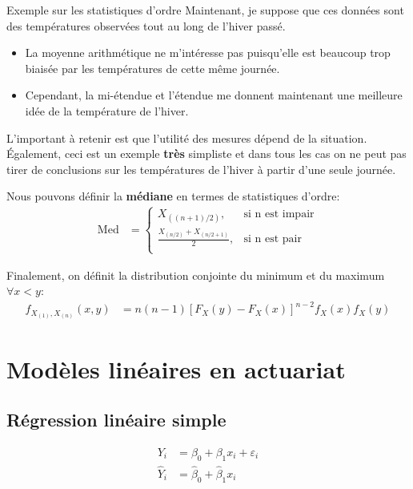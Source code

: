 \documentclass[10pt, french]{article}
\begin{document}
\begin{multicols*}{2}
\begin{conceptgen}{Exemple sur les statistiques d'ordre}
Maintenant, je suppose que ces données sont des températures observées tout au long de l'hiver passé.
\begin{itemize}[leftmargin = *]
	\item	La moyenne arithmétique ne m'intéresse pas puisqu'elle est beaucoup trop biaisée par les températures de cette même journée. 
	\item	Cependant, la mi-étendue et l'étendue me donnent maintenant une meilleure idée de la température de l'hiver.
\end{itemize}

L'important à retenir est que l'utilité des mesures dépend de la situation. Également, ceci est un exemple \textbf{très} simpliste et dans tous les cas on ne peut pas tirer de conclusions sur les températures de l'hiver à partir d'une seule journée.
\end{conceptgen}

Nous pouvons définir la \textbf{médiane} en termes de statistiques d'ordre:
\begin{align*}
	\text{Med}
	&=	\left\{
		\begin{matrix}
			X_{((n + 1)/2)},		&	\text{si n est impair}	\\
			\frac{X_{(n/2)} + X_{(n/2 + 1)}}{2},	&	\text{si n est pair}	\\
		\end{matrix}
	\right.
\end{align*}

Finalement, on définit la distribution conjointe du minimum et du maximum $\forall x < y$:
\begin{align*}
	f_{X_{(1)}, X_{(n)}}(x, y)
	&=	n (n - 1) [F_{X}(y) - F_{X}(x)]^{n - 2} f_{X}(x) f_{X}(y)
\end{align*}

\pagebreak

\section*{Modèles linéaires en actuariat}

\subsection*{Régression linéaire simple}

\begin{definitionNOHFILL}
\begin{align*}
	Y_{i} 
	&=	\beta_{0} + \beta_{1} x_{i} + \varepsilon_{i}	\\
	\hat{Y}_{i} 
	&=	\hat{\beta}_{0} + \hat{\beta}_{1} x_{i} 
\end{align*}
\end{definitionNOHFILL}


\end{multicols*}
\end{document}
